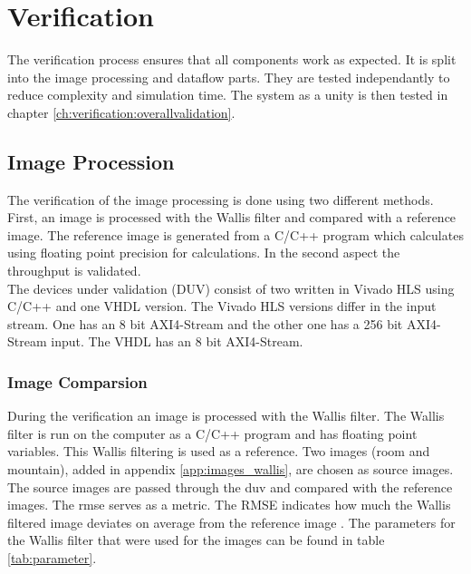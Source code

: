 %
%
\section{Verification} \label{ch:verification}
The verification process ensures that all components work as expected. It is
split into the image processing and dataflow parts. They are tested
independantly to reduce complexity and simulation time. The system as a unity is
then tested in chapter \ref{ch:verification:overallvalidation}.

%
%
\subsection{Image Procession}\label{ch:verification:imageprocessing}
The verification of the image processing is done using two different 
methods. First, an image is processed with the Wallis filter and compared 
with a reference image. The reference image is generated from a C/C++ program 
which calculates using floating point precision for calculations. In the second
aspect the 
throughput is validated. \\
The devices under validation (DUV) consist of two written in Vivado HLS using
C/C++
and one VHDL version. The Vivado HLS versions differ in the input stream. One 
has an 8 bit AXI4-Stream and the other one has a 256 bit AXI4-Stream input. The
VHDL has an 8 bit AXI4-Stream.

\subsubsection*{Image Comparsion}
During the verification an image is processed with the Wallis filter. The Wallis
filter is run on the computer as a C/C++ program and has floating point
variables. This Wallis filtering is used as a reference. Two images (room and
mountain), added in appendix \ref{app:images_wallis}, are chosen as source images. \\
The source images are passed through the \gls{duv} and compared with the reference
images. The \gls{rmse} serves as a metric. The RMSE
indicates how much the  Wallis filtered image deviates on average from the
reference image \cite{rmse}. The parameters for the Wallis filter that were used
for the images can be found in table \ref{tab:parameter}.

